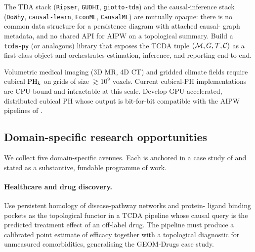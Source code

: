 \begin{challenge}\label{c:software}
The TDA stack (\texttt{Ripser}, \texttt{GUDHI}, \texttt{giotto-tda})
and the causal-inference stack (\texttt{DoWhy}, \texttt{causal-learn},
\texttt{EconML}, \texttt{CausalML}) are mutually opaque: there is no
common data structure for a persistence diagram with attached causal-
graph metadata, and no shared API for AIPW on a topological summary.
Build a \texttt{tcda-py} (or analogous) library that exposes the TCDA
tuple $(\mathcal{M}, G, \mathcal{T}, \mathcal{C})$ as a first-class object and orchestrates
estimation, inference, and reporting end-to-end.
\end{challenge}

\begin{challenge}
\label{c:gpu-cubical}
Volumetric medical imaging (3D MR, 4D CT) and gridded climate fields
require cubical $\mathrm{PH}_{k}$ on grids of size $\gtrsim 10^9$ voxels.
Current cubical-PH implementations are CPU-bound and intractable at
this scale. Develop GPU-accelerated, distributed cubical PH whose
output is bit-for-bit compatible with the AIPW pipelines of
\citet{kim2026topological}.
\end{challenge}

\subsection{Domain-specific research opportunities}\label{sec:research_domains}

We collect five domain-specific avenues. Each is anchored in a case
study of  and stated as a substantive,
fundable programme of work.

\paragraph{Healthcare and drug discovery.}
\begin{research}
\label{r:healthcare-repurposing}
Use persistent homology of disease-pathway networks and protein-
ligand binding pockets \citep{kovacev2016using,cang2018integration,
axelrod2022geom} as the topological functor in a TCDA pipeline whose
causal query is the predicted treatment effect of an off-label drug.
The pipeline must produce a calibrated point estimate of efficacy
together with a topological diagnostic for unmeasured comorbidities,
generalising the \citet{kim2026topological} GEOM-Drugs case study.
\end{research}

